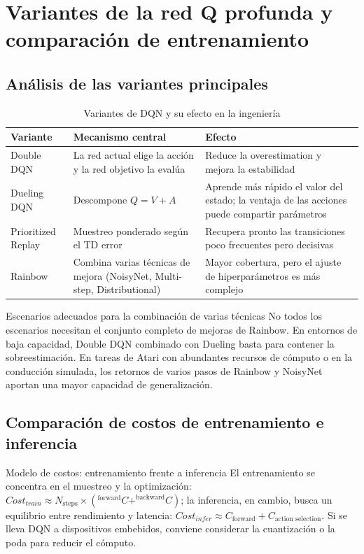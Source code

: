 \section{Variantes de la red Q profunda y comparación de entrenamiento}

\subsection{Análisis de las variantes principales}

\begin{table}[H]
\centering
\begin{tabular}{lll}
\toprule
Variante & Mecanismo central & Efecto \\
\midrule
Double DQN & La red actual elige la acción y la red objetivo la evalúa & Reduce la overestimation y mejora la estabilidad \\
Dueling DQN & Descompone $Q=V+A$ & Aprende más rápido el valor del estado; la ventaja de las acciones puede compartir parámetros \\
Prioritized Replay & Muestreo ponderado según el TD error & Recupera pronto las transiciones poco frecuentes pero decisivas \\
Rainbow & Combina varias técnicas de mejora (NoisyNet, Multi-step, Distributional) & Mayor cobertura, pero el ajuste de hiperparámetros es más complejo \\
\bottomrule
\end{tabular}
\caption{Variantes de DQN y su efecto en la ingeniería}
\end{table}

\begin{knowledgebox}{Escenarios adecuados para la combinación de varias técnicas}
No todos los escenarios necesitan el conjunto completo de mejoras de Rainbow. En entornos de baja capacidad, Double DQN combinado con Dueling basta para contener la sobreestimación. En tareas de Atari con abundantes recursos de cómputo o en la conducción simulada, los retornos de varios pasos de Rainbow y NoisyNet aportan una mayor capacidad de generalización.
\end{knowledgebox}

\subsection{Comparación de costos de entrenamiento e inferencia}

\begin{importantbox}{Modelo de costos: entrenamiento frente a inferencia}
El entrenamiento se concentra en el muestreo y la optimización: $Cost_{train} \approx N_{\text{steps}} \times (^{\text{forward}}C + ^{\text{backward}}C)$; la inferencia, en cambio, busca un equilibrio entre rendimiento y latencia: $Cost_{infer} \approx C_{\text{forward}} + C_{\text{action selection}}$. Si se lleva DQN a dispositivos embebidos, conviene considerar la cuantización o la poda para reducir el cómputo.
\end{importantbox}

